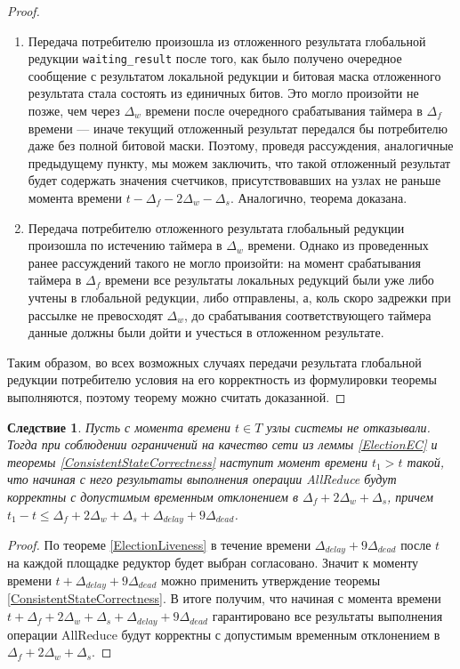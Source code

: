 \documentclass{article}
\theoremstyle{plain}
\theoremstyle{plain}
\newtheorem{consequence}[theorem]{Следствие}
\theoremstyle{plain}
\theoremstyle{plain}
\theoremstyle{definition}
\theoremstyle{remark}
\theoremstyle{plain}
\begin{document}
\begin{proof}
\begin{enumerate}
        \item Передача потребителю произошла из отложенного результата глобальной редукции \texttt{waiting\_result} после того, как было получено очередное сообщение с результатом локальной редукции и битовая маска отложенного результата стала состоять из единичных битов. Это могло произойти не позже, чем через $\Delta_w$ времени после очередного срабатывания таймера в $\Delta_f$ времени --- иначе текущий отложенный результат передался бы потребителю даже без полной битовой маски. Поэтому, проведя рассуждения, аналогичные предыдущему пункту, мы можем заключить, что такой отложенный результат будет содержать значения счетчиков, присутствовавших на узлах не раньше момента времени $t - \Delta_f - 2\Delta_w - \Delta_s$. Аналогично, теорема доказана.
        
        \item Передача потребителю отложенного результата глобальный редукции произошла по истечению таймера в $\Delta_w$ времени. Однако из проведенных ранее рассуждений такого не могло произойти: на момент срабатывания таймера в $\Delta_f$ времени все результаты локальных редукций были уже либо учтены в глобальной редукции, либо отправлены, а, коль скоро задрежки при рассылке не превосходят $\Delta_w$, до срабатывания соответствующего таймера данные должны были дойти и учесться в отложенном результате.
    \end{enumerate}
    
    Таким образом, во всех возможных случаях передачи результата глобальной редукции потребителю условия на его корректность из формулировки теоремы выполняются, поэтому теорему можно считать доказанной.
\end{proof}

\begin{consequence}
    Пусть с момента времени $t \in T$ узлы системы не отказывали. Тогда при соблюдении ограничений на качество сети из леммы \ref{ElectionEC} и теоремы \ref{ConsistentStateCorrectness} наступит момент времени $t_1 > t$ такой, что начиная с него результаты выполнения операции AllReduce будут корректны с допустимым временным отклонением в $\Delta_f + 2\Delta_w + \Delta_s$, причем $t_1 - t \leq \Delta_f + 2\Delta_w + \Delta_s + \Delta_{delay} + 9\Delta_{dead}$.
\end{consequence}
\begin{proof}
    По теореме \ref{ElectionLiveness} в течение времени $\Delta_{delay} + 9\Delta_{dead}$ после $t$ на каждой площадке редуктор будет выбран согласовано. Значит к моменту времени $t + \Delta_{delay} + 9\Delta_{dead}$ можно применить утверждение теоремы \ref{ConsistentStateCorrectness}. В итоге получим, что начиная с момента времени $t + \Delta_f + 2\Delta_w + \Delta_s + \Delta_{delay} + 9\Delta_{dead}$ гарантировано все результаты выполнения операции AllReduce будут корректны с допустимым временным отклонением в $\Delta_f + 2\Delta_w + \Delta_s$.
\end{proof}
\end{document}
